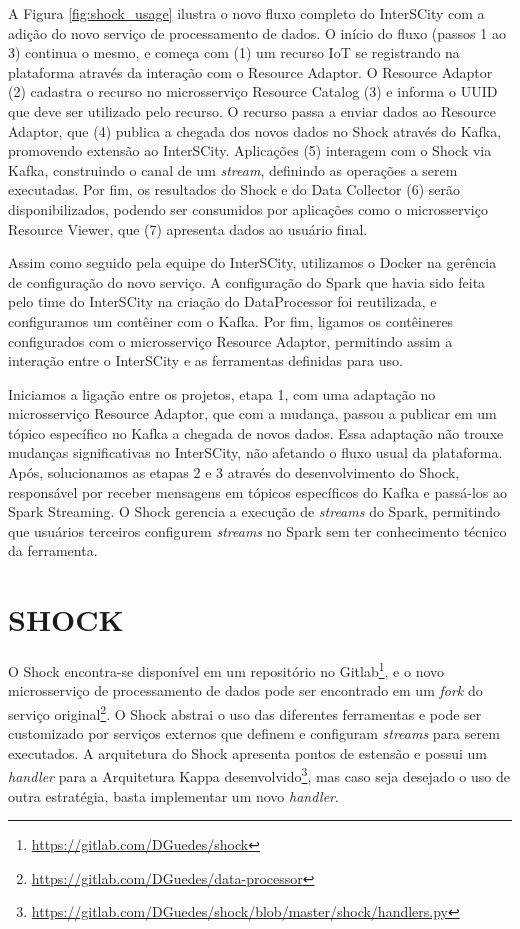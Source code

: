 A Figura \ref{fig:shock_usage} ilustra o novo fluxo completo do InterSCity com a
adição do novo serviço de processamento de dados. O início do fluxo (passos 1 ao
3) continua o mesmo, e começa com (1) um recurso IoT se registrando na plataforma
através da interação com o Resource Adaptor. O Resource Adaptor (2) cadastra o
recurso no microsserviço Resource Catalog (3) e informa o UUID que deve ser
utilizado pelo recurso. O recurso passa a enviar dados ao Resource Adaptor, que
(4) publica a chegada dos novos dados no Shock através do Kafka, promovendo
extensão ao InterSCity.  Aplicações (5) interagem com o Shock via Kafka,
construindo o canal de um \textit{stream}, definindo as operações a
serem executadas.  Por fim, os resultados do Shock e do Data Collector (6)
serão disponibilizados, podendo ser consumidos por aplicações como o
microsserviço Resource Viewer, que (7) apresenta dados ao usuário final.

Assim como seguido pela equipe do InterSCity, utilizamos o Docker na gerência de
configuração do novo serviço. A configuração do Spark que havia sido feita pelo
time do InterSCity na criação do DataProcessor foi reutilizada, e configuramos
um contêiner com o Kafka. Por fim, ligamos os contêineres configurados com o
microsserviço Resource Adaptor, permitindo assim a interação entre o InterSCity
e as ferramentas definidas para uso.

Iniciamos a ligação entre os projetos, etapa 1, com uma adaptação no
microsserviço Resource Adaptor, que com a mudança, passou a publicar em um tópico
específico no Kafka a chegada de novos dados. Essa adaptação não trouxe mudanças
significativas no InterSCity, não afetando o fluxo usual da plataforma.
Após, solucionamos as etapas 2 e 3 através do desenvolvimento do Shock,
responsável por receber mensagens em tópicos específicos do Kafka e passá-los
ao Spark Streaming. O Shock gerencia a execução de \textit{streams} do Spark,
permitindo que usuários terceiros configurem \textit{streams} no Spark sem ter
conhecimento técnico da ferramenta.

\section{SHOCK}

O Shock encontra-se disponível em um repositório no
Gitlab\footnote{\url{https://gitlab.com/DGuedes/shock}}, e o novo microsserviço
de processamento de dados pode ser encontrado em um \textit{fork} do serviço
original\footnote{\url{https://gitlab.com/DGuedes/data-processor}}. O Shock
abstrai o uso das diferentes ferramentas e pode ser customizado
por serviços externos que definem e configuram \textit{streams} para serem
executados. A arquitetura do Shock apresenta pontos de estensão e possui
um \textit{handler} para a Arquitetura Kappa
desenvolvido\footnote{\url{https://gitlab.com/DGuedes/shock/blob/master/shock/handlers.py}},
mas caso seja desejado o uso de outra estratégia, basta implementar um novo
\textit{handler}.

